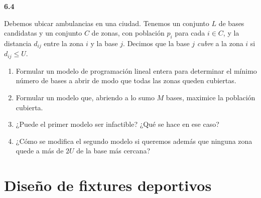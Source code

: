\documentclass[11pt,a4paper]{article}
\newcommand{\ejercicio}[1]{\par\medskip\noindent\textbf{#1}\par\nopagebreak\smallskip}
\begin{document}
\ejercicio{6.4}
Debemos ubicar ambulancias en una ciudad. Tenemos un conjunto $L$ de bases
candidatas y un conjunto $C$ de zonas, con población $p_i$ para cada
$i \in C$, y la distancia $d_{ij}$ entre la zona $i$ y la base $j$. Decimos que
la base $j$ \emph{cubre} a la zona $i$ si $d_{ij} \le U$.
\begin{enumerate}
  \item Formular un modelo de programación lineal entera para determinar el
  mínimo número de bases a abrir de modo que todas las zonas queden cubiertas.
  \item Formular un modelo que, abriendo a lo sumo $M$ bases, maximice la
  población cubierta.
  \item ¿Puede el primer modelo ser infactible? ¿Qué se hace en ese caso?
  \item ¿Cómo se modifica el segundo modelo si queremos además que ninguna zona
  quede a más de $2U$ de la base más cercana?
\end{enumerate}

\section{Diseño de fixtures deportivos}
\end{document}
